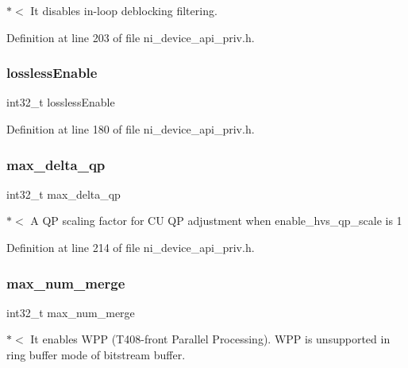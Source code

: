 $\ast$$<$ It disables in-\/loop deblocking filtering. 

Definition at line 203 of file ni\+\_\+device\+\_\+api\+\_\+priv.\+h.

\mbox{\label{struct__ni__t408__config__t_a1d850cd27f39c5f7f7f9559225b94596}} 
\subsubsection{\texorpdfstring{losslessEnable}{losslessEnable}}
{\footnotesize\ttfamily int32\+\_\+t lossless\+Enable}



Definition at line 180 of file ni\+\_\+device\+\_\+api\+\_\+priv.\+h.

\mbox{\label{struct__ni__t408__config__t_a8f44c3ec7a96e9c82494a7bc6d615cd6}} 
\subsubsection{\texorpdfstring{max\_delta\_qp}{max\_delta\_qp}}
{\footnotesize\ttfamily int32\+\_\+t max\+\_\+delta\+\_\+qp}

$\ast$$<$ A QP scaling factor for CU QP adjustment when enable\+\_\+hvs\+\_\+qp\+\_\+scale is 1 

Definition at line 214 of file ni\+\_\+device\+\_\+api\+\_\+priv.\+h.

\mbox{\label{struct__ni__t408__config__t_a3e28a1e79bff6d88d16170c3d1006686}} 
\subsubsection{\texorpdfstring{max\_num\_merge}{max\_num\_merge}}
{\footnotesize\ttfamily int32\+\_\+t max\+\_\+num\+\_\+merge}

$\ast$$<$ It enables W\+PP (T408-\/front Parallel Processing). W\+PP is unsupported in ring buffer mode of bitstream buffer. 

